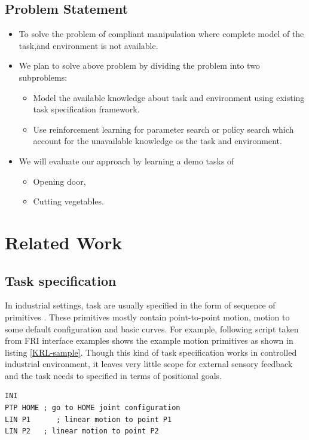 \documentclass[thesis]{mas_proposal}
\begin{document}
\section{Problem Statement}
\begin{itemize}
	\item To solve the problem of compliant manipulation where complete model of the task,and environment is not available.
	\item We plan to solve above problem by dividing the problem into two subproblems:
	\begin{itemize}
		\item Model the available knowledge about task and environment using existing task specification framework.
		\item Use reinforcement learning for parameter search or policy search which account for the unavailable knowledge os the task and environment.
	\end{itemize}
    \item We will evaluate our approach by learning a demo tasks of 
    \begin{itemize}
    	\item Opening door,
    	\item Cutting vegetables.
    \end{itemize} 
\end{itemize}


\chapter{Related Work}
\section{Task specification}
In industrial settings, task are usually specified in the form of sequence of primitives \cite{leidner2017cognitive}. These primitives mostly contain point-to-point motion, motion to some default configuration and basic curves. For example, following script taken from FRI interface examples shows the example motion primitives as shown in listing \ref{KRL-sample}. Though this kind of task specification works in controlled industrial environment, it leaves very little scope for external sensory feedback and the task needs to specified in terms of positional goals.

\begin{lstlisting}[label=KRL-sample,caption=KUKA Robot Language code]
INI
PTP HOME ; go to HOME joint configuration
LIN P1      ; linear motion to point P1
LIN P2	 ; linear motion to point P2
\end{lstlisting}
\end{document}
